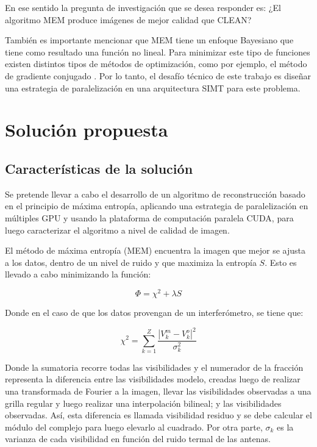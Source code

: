 En ese sentido la pregunta de investigación que se desea responder es: ¿El algoritmo MEM produce imágenes de mejor calidad que CLEAN?

También es importante mencionar que MEM tiene un enfoque Bayesiano que tiene como resultado una función no lineal. Para minimizar este tipo de funciones existen distintos tipos de métodos de optimización, como por ejemplo, el método de gradiente conjugado \citep{ncg}. Por lo tanto, el desafío técnico de este trabajo es diseñar una estrategia de paralelización en una arquitectura SIMT para este problema.



\section{Soluci\'on propuesta}
\label{intro:solucion}
\subsection{Características de la solución}
\label{subsec:caracteristicas}
Se pretende llevar a cabo el desarrollo de un algoritmo de reconstrucción basado en el principio de máxima entropía, aplicando una estrategia de paralelización en múltiples GPU y usando la plataforma de computación paralela CUDA, para luego caracterizar el algoritmo a nivel de calidad de imagen.

El método de máxima entropía (MEM) encuentra la imagen que mejor se ajusta a los datos, dentro de un nivel de ruido y que maximiza la entropía $S$. Esto es llevado a cabo minimizando la función:

\begin{equation}
\Phi = \chi^{2} + \lambda S
\label{eq:firstchi}
\end{equation}

Donde en el caso de que los datos provengan de un interferómetro, se tiene que:

\begin{equation}
\chi^{2} = \sum_{k=1}^{Z} \frac{|V^m_{k}-V^o_{k}|^{2}}{\sigma^{2}_{k}}
\end{equation}

Donde la sumatoria recorre todas las visibilidades y el numerador de la fracción representa la diferencia entre las visibilidades modelo, creadas luego de realizar una transformada de Fourier a la imagen, llevar las visibilidades observadas a una grilla regular y luego realizar una interpolación bilineal; y las visibilidades observadas. Así, esta diferencia es llamada visibilidad residuo y se debe calcular el módulo del complejo para luego elevarlo al cuadrado. Por otra parte, $\sigma_{k}$ es la varianza de cada visibilidad en función del ruido termal de las antenas.

